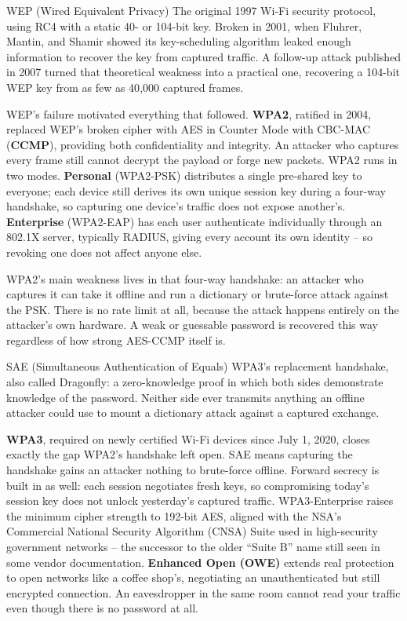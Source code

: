 \begin{definition}{WEP (Wired Equivalent Privacy)}
The original 1997 Wi-Fi security protocol, using RC4 with a static 40- or 104-bit key. Broken in
2001, when Fluhrer, Mantin, and Shamir showed its key-scheduling algorithm leaked enough
information to recover the key from captured traffic. A follow-up attack published
in 2007 turned that theoretical weakness into a practical one, recovering a 104-bit WEP key from as
few as 40{,}000 captured frames.
\end{definition}

WEP's failure motivated everything that followed. \textbf{WPA2}, ratified in 2004, replaced WEP's
broken cipher with AES in Counter Mode with CBC-MAC (\textbf{CCMP}), providing both confidentiality
and integrity. An attacker who captures every frame still cannot decrypt the payload or forge new
packets. WPA2 runs in two modes. \textbf{Personal} (WPA2-PSK) distributes a single pre-shared key
to everyone; each device still derives its own unique session key during a four-way handshake, so
capturing one device's traffic does not expose another's. \textbf{Enterprise} (WPA2-EAP) has each
user authenticate individually through an 802.1X server, typically RADIUS, giving every account its
own identity -- so revoking one does not affect anyone else.

WPA2's main weakness lives in that four-way handshake: an attacker who captures it can take it
offline and run a dictionary or brute-force attack against the PSK. There is no rate limit at all,
because the attack happens entirely on the attacker's own hardware. A weak or guessable password
is recovered this way regardless of how strong AES-CCMP itself is.

\begin{definition}{SAE (Simultaneous Authentication of Equals)}
WPA3's replacement handshake, also called Dragonfly: a zero-knowledge proof in which both sides
demonstrate knowledge of the password. Neither side ever transmits anything an offline attacker
could use to mount a dictionary attack against a captured exchange.
\end{definition}

\textbf{WPA3}, required on newly certified Wi-Fi devices since July 1, 2020, closes exactly the gap
WPA2's handshake left open. SAE means capturing the handshake gains an attacker
nothing to brute-force offline. Forward secrecy is built in as well: each session negotiates fresh
keys, so compromising today's session key does not unlock yesterday's captured traffic.
WPA3-Enterprise raises the minimum cipher strength to 192-bit AES, aligned with the NSA's Commercial
National Security Algorithm (CNSA) Suite used in high-security government networks -- the successor
to the older ``Suite B'' name still seen in some vendor documentation.
\textbf{Enhanced Open (OWE)} extends real protection to open networks like a coffee shop's,
negotiating an unauthenticated but still encrypted connection. An eavesdropper in the same room
cannot read your traffic even though there is no password at all.

